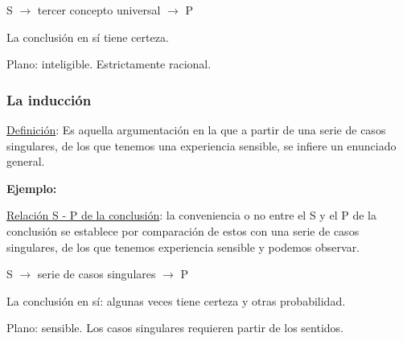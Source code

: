 \documentclass{article}
\begin{document}
\begin{center}
   S $\rightarrow$ tercer concepto universal $\rightarrow$ P
\end{center}

La conclusión en sí tiene certeza.
\par Plano: inteligible. Estrictamente racional.


\subsubsection{La inducción}
\underline{Definición}: Es aquella argumentación en la que a partir de una serie de casos singulares, de los que tenemos una experiencia sensible, se infiere un enunciado general.
\par \textbf{Ejemplo:}

\par \underline{Relación S - P de la conclusión}: la conveniencia o no entre el S y el P de la conclusión se establece por comparación de estos con una serie de casos singulares, de los que tenemos experiencia sensible y podemos observar.

\begin{center}
S $\rightarrow$ serie de casos singulares $\rightarrow$ P
\end{center}

La conclusión en sí: algunas veces tiene certeza y otras probabilidad.
\par Plano: sensible. Los casos singulares requieren partir de los sentidos.
\end{document}

